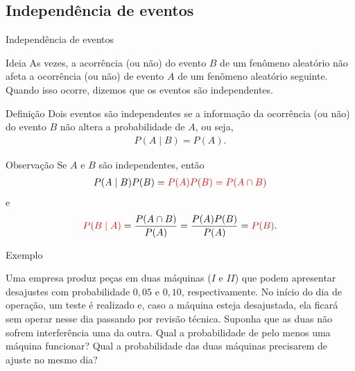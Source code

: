 \documentclass[9pt]{beamer}
\begin{document}
\subsection{Independência de eventos}
\begin{frame}{Independência de eventos}
\begin{block}{Ideia}
	As vezes, a acorrência (ou não) do evento $B$ de um fenômeno aleatório não afeta a ocorrência (ou não) de evento $A$ de um fenômeno aleatório seguinte.
	Quando isso ocorre, dizemos que os eventos são independentes.
\end{block}
	
\begin{block}{Definição}
	Dois eventos são independentes se a informação da ocorrência (ou não) do evento $B$ não altera a probabilidade de $A$, ou seja,
	\begin{align*}
	P(A \mid B) = P(A).
	\end{align*}
\end{block}

\begin{block}{Observação}
	Se $A$ e $B$ são independentes, então
	\begin{align*}
	P(A \mid B) P(B) = \textcolor{red}{P(A) P(B) = P(A \cap B)} 
	\end{align*} 
	e 
	\begin{align*}
	\textcolor{red}{P(B \mid A)} = \dfrac{P(A \cap B)}{P(A)} = \dfrac{P(A) P(B)}{P(A)} = \textcolor{red}{P(B)}.
	\end{align*}
\end{block}

\end{frame}

\begin{frame}{Exemplo}


Uma empresa produz peças em duas máquinas ($I$ e $II$) que podem apresentar desajustes com probabilidade $0,05$ e $0,10$, respectivamente. 
No início do dia de operação, um teste é realizado e, caso a máquina esteja desajustada, ela ficará sem operar nesse dia passando por revisão técnica. 
Suponha que as duas não sofrem interferência uma da outra. Qual a probabilidade de pelo menos uma máquina funcionar? Qual a probabilidade das duas máquinas precisarem de ajuste no mesmo dia?

\end{frame}
\end{document}
